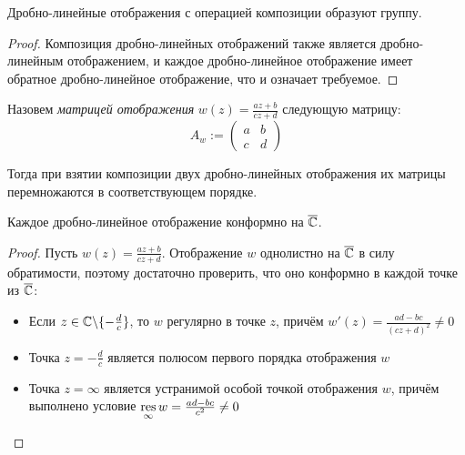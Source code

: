 \begin{unnecessary}
    
\begin{corollary}
	Дробно-линейные отображения с операцией композиции образуют группу.
\end{corollary}

\begin{proof}
	Композиция дробно-линейных отображений также является дробно-линейным отображением, и каждое дробно-линейное отображение имеет обратное дробно-линейное отображение, что и означает требуемое.
\end{proof}

\begin{note}
	Назовем \textit{матрицей отображения} $w(z) = \frac{az + b}{cz + d}$ следующую матрицу:
	\[A_w := \begin{pmatrix} a&b\\c&d\end{pmatrix}\]
	
	Тогда при взятии композиции двух дробно-линейных отображения их матрицы перемножаются в соответствующем порядке.
\end{note}

\end{unnecessary}

\begin{proposition}
	Каждое дробно-линейное отображение конформно на $\overline{\mathbb{C}}$.
\end{proposition}

\begin{proof}
	Пусть $w(z) = \frac{az + b}{cz + d}$. Отображение $w$ однолистно на $\overline{\mathbb{C}}$ в силу обратимости, поэтому достаточно проверить, что оно конформно в каждой точке из $\overline{\mathbb{C}}$:
	\begin{itemize}
		\item Если $z \in \mathbb{C} \backslash \{-\frac dc\}$, то $w$ регулярно в точке $z$, причём $w'(z) = \frac{ad - bc}{(cz + d)^2} \ne 0$
		
		\item Точка $z = -\frac dc$ является полюсом первого порядка отображения $w$
		
		\item Точка $z = \infty$ является устранимой особой точкой отображения $w$, причём выполнено условие $\operatorname*{res}\limits_\infty w = \frac{ad - bc}{c^2} \ne 0$\qedhere
	\end{itemize}
\end{proof}


